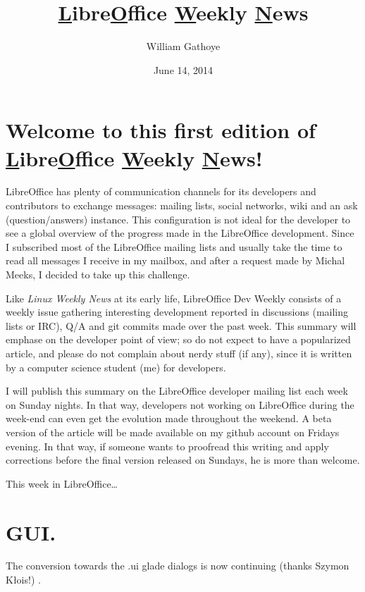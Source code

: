 \documentclass{article}
\begin{document}
\title{\underline{L}ibre\underline{O}ffice \underline{W}eekly \underline{N}ews}
\author{William Gathoye}
\date{June 14, 2014}
\maketitle


\section{Welcome to this first edition of \underline{L}ibre\underline{O}ffice \underline{W}eekly \underline{N}ews!}

LibreOffice has plenty of communication channels for its developers and contributors to exchange messages: mailing lists, social networks, wiki and an ask (question/answers) instance. This configuration is not ideal for the developer to see a global overview of the progress made in the LibreOffice development. Since I subscribed most of the LibreOffice mailing lists and usually take the time to read all messages I receive in my mailbox, and after a request made by Michal Meeks, I decided to take up this challenge.

Like \emph{Linux Weekly News} at its early life, LibreOffice Dev Weekly consists of a weekly issue gathering interesting development reported in discussions (mailing lists or IRC), Q/A and git commits made over the past week. This summary will emphase on the developer point of view; so do not expect to have a popularized article, and please do not complain about nerdy stuff (if any), since it is written by a computer science student (me) for developers. 

I will publish this summary on the LibreOffice developer mailing list each week on Sunday nights. In that way, developers not working on LibreOffice during the week-end can even get the evolution made throughout the weekend. A beta version of the article will be made available on my github account\cite{wgetGithub} on Fridays evening. In that way, if someone wants to proofread this writing and apply corrections before the final version released on Sundays, he is more than welcome.

This week in LibreOffice\ldots

\section{GUI.}

The conversion towards the .ui glade dialogs is now continuing (thanks Szymon Kłois!) \cite{gladeUi1,gladeUi2,gladeUi3}.
\end{document}

